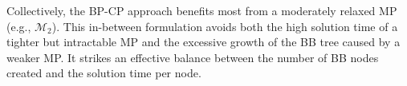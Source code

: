 \documentclass[12pt]{article}
\begin{document}

Collectively, the BP-CP approach benefits most from a moderately relaxed MP (e.g., $\mathcal{M}_2$). This in-between formulation avoids both the high solution time of a tighter but intractable MP and the excessive growth of the BB tree caused by a weaker MP. It strikes an effective balance between the number of BB nodes created and the solution time per node.



\end{document}
